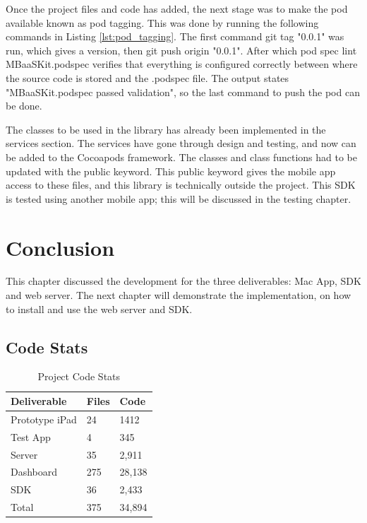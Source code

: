 Once the project files and code has added, the next stage was to make the pod available known as pod tagging. This was done by running the following commands in Listing \ref{lst:pod_tagging}. The first command git tag "0.0.1" was run, which gives a version, then git push origin "0.0.1". After which pod spec lint MBaaSKit.podspec verifies that everything is configured correctly between where the source code is stored and the .podspec file. The output states "MBaaSKit.podspec passed validation", so the last command to push the pod can be done. 



The classes to be used in the library has already been implemented in the services section. The services have gone through design and testing, and now can be added to the Cocoapods framework. The classes and class functions had to be updated with the public keyword. This public keyword gives the mobile app access to these files, and this library is technically outside the project. This SDK is tested using another mobile app; this will be discussed in the testing chapter.

\section{Conclusion}

This chapter discussed the development for the three deliverables: Mac App, SDK and web server. The next chapter will demonstrate the implementation, on how to install and use the web server and SDK. 

\subsection{Code Stats}

\begin{table}[!h]
\centering
\caption{Project Code Stats}
\label{my-label}
\begin{tabular}{|l|l|l|}
\hline
\rowcolor{green!20}
Deliverable & Files & Code   \\ \hline
Prototype iPad & 24 & 1412 \\ \hline
Test App & 4 & 345 \\ \hline
Server      & 35    & 2,911  \\ \hline
Dashboard   & 275   & 28,138 \\ \hline
SDK         & 36    & 2,433  \\ \hline
Total       & 375   & 34,894 \\ \hline
\end{tabular}
\end{table}